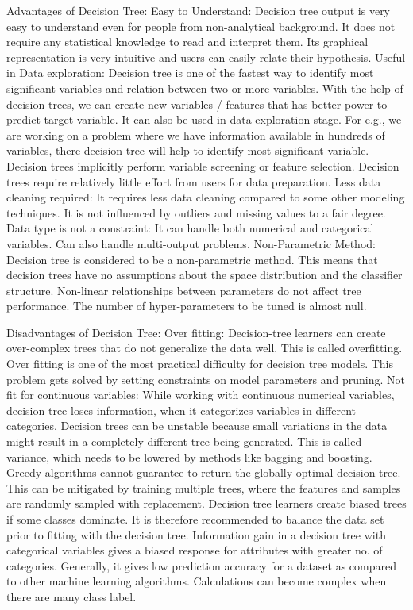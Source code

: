 \documentclass[12pt]{article}
\begin{document}
Advantages of Decision Tree:
Easy to Understand: Decision tree output is very easy to understand even for people from non-analytical background. It does not require any statistical knowledge to read and interpret them. Its graphical representation is very intuitive and users can easily relate their hypothesis.
Useful in Data exploration: Decision tree is one of the fastest way to identify most significant variables and relation between two or more variables. With the help of decision trees, we can create new variables / features that has better power to predict target variable. It can also be used in data exploration stage. For e.g., we are working on a problem where we have information available in hundreds of variables, there decision tree will help to identify most significant variable.
Decision trees implicitly perform variable screening or feature selection.
Decision trees require relatively little effort from users for data preparation.
Less data cleaning required: It requires less data cleaning compared to some other modeling techniques. It is not influenced by outliers and missing values to a fair degree.
Data type is not a constraint: It can handle both numerical and categorical variables. Can also handle multi-output problems.
Non-Parametric Method: Decision tree is considered to be a non-parametric method. This means that decision trees have no assumptions about the space distribution and the classifier structure.
Non-linear relationships between parameters do not affect tree performance.
The number of hyper-parameters to be tuned is almost null.

Disadvantages of Decision Tree:
Over fitting: Decision-tree learners can create over-complex trees that do not generalize the data well. This is called overfitting. Over fitting is one of the most practical difficulty for decision tree models. This problem gets solved by setting constraints on model parameters and pruning.
Not fit for continuous variables: While working with continuous numerical variables, decision tree loses information, when it categorizes variables in different categories.
Decision trees can be unstable because small variations in the data might result in a completely different tree being generated. This is called variance, which needs to be lowered by methods like bagging and boosting.
Greedy algorithms cannot guarantee to return the globally optimal decision tree. This can be mitigated by training multiple trees, where the features and samples are randomly sampled with replacement.
Decision tree learners create biased trees if some classes dominate. It is therefore recommended to balance the data set prior to fitting with the decision tree.
Information gain in a decision tree with categorical variables gives a biased response for attributes with greater no. of categories.
Generally, it gives low prediction accuracy for a dataset as compared to other machine learning algorithms.
Calculations can become complex when there are many class label.
\end{document}
